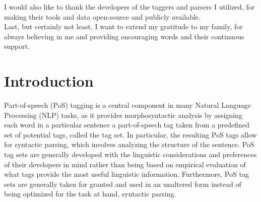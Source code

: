 \documentclass[a4paper,12pt,english]{book}
\begin{document}
I would also like to thank the developers of the taggers and parsers I
utilized, for making their tools and data open-source and publicly available.
\\

Last, but certainly not least, I want to extend my gratitude to my family, for
always believing in me and providing encouraging words and their continuous
support.

\frontmatter{}
\fancyhead[LE]{\nouppercase\leftmark}
\fancyhead[RO]{\nouppercase\rightmark}
\tableofcontents{}
\listoftables{}
\listoffigures{}

\mainmatter{}
\chapter{Introduction}
\label{sec:introduction}


Part-of-speech (PoS) tagging is a central component in many Natural Language
Processing (NLP) tasks, as it provides morphosyntactic analysis by assigning
each word in a particular sentence a part-of-speech tag taken from a predefined
set of potential tags, called the tag set. In particular, the resulting PoS
tags allow for syntactic parsing, which involves analyzing the structure of the
sentence. PoS tag sets are generally developed with the linguistic
considerations and preferences of their developers in mind
rather than being based on empirical evaluation of what tags provide the most
useful linguistic information.
Furthermore, PoS tag sets are generally taken for granted and used in an
unaltered form
instead of being optimized for the task at hand, syntactic parsing.
\end{document}
